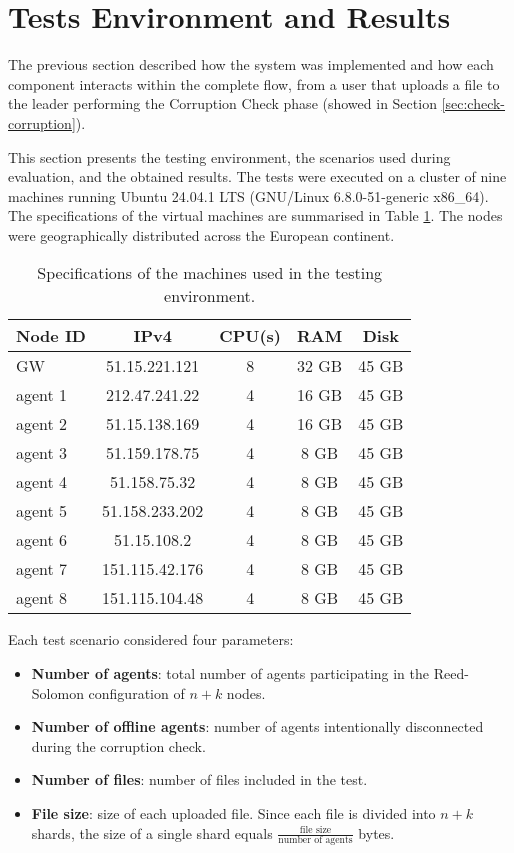 \section{Tests Environment and Results}

The previous section described how the system was implemented and how each
component interacts within the complete flow, from a user that uploads a file to
the leader performing the Corruption Check phase (showed in Section
\ref{sec:check-corruption}).

This section presents the testing environment, the scenarios used during evaluation, and the obtained results. The tests were executed on a cluster of nine machines running Ubuntu 24.04.1 LTS (GNU/Linux 6.8.0-51-generic x86\_64). The specifications of the virtual machines are summarised in Table \ref{tab:vms-specs}. The nodes were geographically distributed across the European continent.

\begin{table}[h!]
    \centering
    \begin{tabular}{|l|c|c|c|c|}
    \hline
       \textbf{Node ID} & \textbf{IPv4} & \textbf{CPU(s)} & \textbf{RAM} & \textbf{Disk} \\
       \hline
        GW & 51.15.221.121 & 8 & 32 GB & 45 GB \\
        agent 1 & 212.47.241.22 & 4 & 16 GB & 45 GB \\
        agent 2 & 51.15.138.169 & 4 & 16 GB & 45 GB \\
        agent 3 & 51.159.178.75 & 4 & 8 GB & 45 GB \\
        agent 4 & 51.158.75.32 & 4 & 8 GB & 45 GB \\
        agent 5 & 51.158.233.202 & 4 & 8 GB & 45 GB \\
        agent 6 & 51.15.108.2 & 4 & 8 GB & 45 GB \\
        agent 7 & 151.115.42.176 & 4 & 8 GB & 45 GB \\
        agent 8 & 151.115.104.48 & 4 & 8 GB & 45 GB \\
        \hline
    \end{tabular}
    \caption{Specifications of the machines used in the testing environment.}
    \label{tab:vms-specs}
\end{table}

Each test scenario considered four parameters:
\begin{itemize}
    \item \textbf{Number of agents}: total number of agents participating in the Reed-Solomon configuration of $n + k$ nodes.
    \item \textbf{Number of offline agents}: number of agents intentionally
        disconnected during the corruption check.
    \item \textbf{Number of files}: number of files included in the test.
    \item \textbf{File size}: size of each uploaded file. Since each file is divided into $n + k$ shards, the size of a single shard equals $\frac{\text{file size}}{\text{number of agents}}$ bytes.
\end{itemize}

